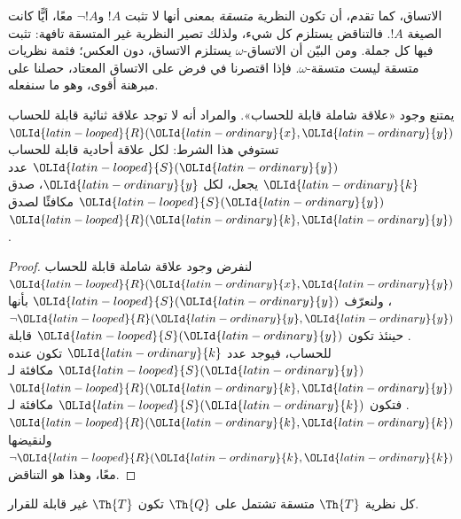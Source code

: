 \documentclass[../../../include/open-logic-section]{subfiles}
\begin{document}


\begin{explain}
الاتساق، كما تقدم، أن تكون النظرية \emph{متسقة} بمعنى أنها لا تثبت
$!A$ و$\lnot !A$ معًا، أيًّا كانت الصيغة $!A$. فالتناقض يستلزم كل
شيء، ولذلك تصير النظرية غير المتسقة تافهة: تثبت فيها كل جملة.
ومن البيّن أن الاتساق-$\omega$ يستلزم الاتساق، دون العكس؛ فثمة
نظريات متسقة ليست متسقة-$\omega$. فإذا اقتصرنا في فرض
 على الاتساق المعتاد، حصلنا على مبرهنة
أقوى، وهو ما سنفعله.
\end{explain}

\begin{lem}
يمتنع وجود «علاقة شاملة قابلة للحساب». والمراد أنه لا توجد علاقة
ثنائية قابلة للحساب ${\OLId{latin-looped}{R}}({\OLId{latin-ordinary}{x}},{\OLId{latin-ordinary}{y}})$ تستوفي هذا الشرط: لكل علاقة أحادية
قابلة للحساب ${\OLId{latin-looped}{S}}({\OLId{latin-ordinary}{y}})$ عدد ${\OLId{latin-ordinary}{k}}$ يجعل، لكل ${\OLId{latin-ordinary}{y}}$، صدق ${\OLId{latin-looped}{S}}({\OLId{latin-ordinary}{y}})$ مكافئًا لصدق
${\OLId{latin-looped}{R}}({\OLId{latin-ordinary}{k}},{\OLId{latin-ordinary}{y}})$.
\end{lem}

\begin{proof}
لنفرض وجود علاقة شاملة قابلة للحساب ${\OLId{latin-looped}{R}}({\OLId{latin-ordinary}{x}},{\OLId{latin-ordinary}{y}})$، ولنعرّف ${\OLId{latin-looped}{S}}({\OLId{latin-ordinary}{y}})$ بأنها
$\lnot {\OLId{latin-looped}{R}}({\OLId{latin-ordinary}{y}},{\OLId{latin-ordinary}{y}})$. حينئذ تكون ${\OLId{latin-looped}{S}}({\OLId{latin-ordinary}{y}})$ قابلة للحساب، فيوجد عدد ${\OLId{latin-ordinary}{k}}$ تكون
عنده ${\OLId{latin-looped}{S}}({\OLId{latin-ordinary}{y}})$ مكافئة لـ${\OLId{latin-looped}{R}}({\OLId{latin-ordinary}{k}},{\OLId{latin-ordinary}{y}})$. فتكون ${\OLId{latin-looped}{S}}({\OLId{latin-ordinary}{k}})$ مكافئة لـ${\OLId{latin-looped}{R}}({\OLId{latin-ordinary}{k}},{\OLId{latin-ordinary}{k}})$
ولنقيضها $\lnot {\OLId{latin-looped}{R}}({\OLId{latin-ordinary}{k}},{\OLId{latin-ordinary}{k}})$ معًا، وهذا هو التناقض.
\end{proof}


\begin{thm}
كل نظرية $\Th{T}$ متسقة تشتمل على $\Th{Q}$ تكون
$\Th{T}$ غير قابلة للقرار.
\end{thm}
\end{document}
